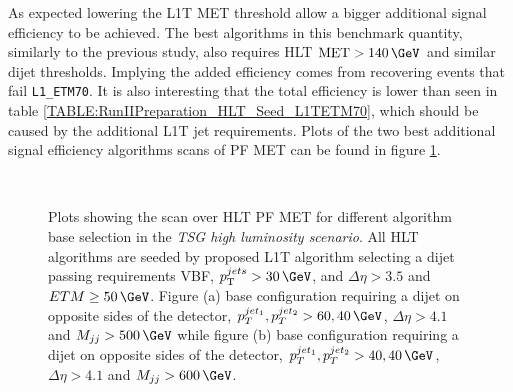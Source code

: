 As expected lowering the \gls{L1T} \gls{MET} threshold allow a bigger additional signal efficiency to be achieved. The best algorithms in this benchmark quantity, similarly to the previous study, also requires \gls{HLT} $\text{MET}>140\,\GeV$  and similar dijet thresholds. Implying the added efficiency comes from recovering events that fail \verb|L1_ETM70|. It is also interesting that the total efficiency is lower than seen in table \ref{TABLE:RunIIPreparation_HLT_Seed_L1TETM70}, which should be caused by the additional \gls{L1T} jet requirements. Plots of the two best additional signal efficiency algorithms scans of \gls{PF} \gls{MET} can be found in figure \ref{FIGURE:RunIIPreparation_HLT_Seed_L1TDijetMET}.

\begin{figure}[!htp]%
\qquad
{}\\
\caption{Plots showing the scan over \gls{HLT} \gls{PF} \gls{MET} for different algorithm base selection in the \textit{\gls{TSG} high luminosity scenario}. All \gls{HLT} algorithms are seeded by proposed \gls{L1T} algorithm selecting a dijet passing requirements \gls{VBF}, $\pt^{jets}>30\,\GeV$, and $\Delta\eta>3.5$ and $ETM \geq 50\,\GeV$. Figure (a) base configuration requiring a dijet on opposite sides of the detector, $p_T^{jet_1},p_T^{jet_2}>60,40\,\GeV$, $\Delta\eta>4.1$ and $M_{jj}>500\,\GeV$ while figure (b) base configuration requiring a dijet on opposite sides of the detector, $p_T^{jet_1},p_T^{jet_2}>40,40\,\GeV$, $\Delta\eta>4.1$ and $M_{jj}>600\,\GeV$.}
\label{FIGURE:RunIIPreparation_HLT_Seed_L1TDijetMET}
\end{figure}

